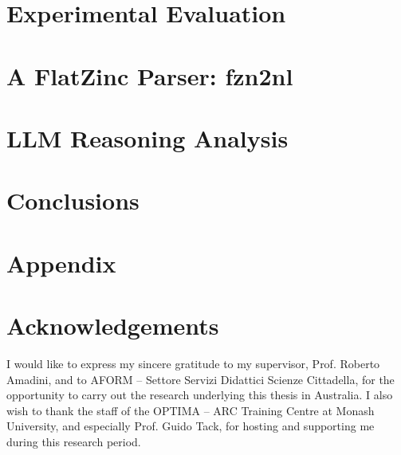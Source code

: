 \documentclass[12pt,a4paper,openright,twoside]{book}
\begin{document}
\chapter{Experimental Evaluation}
\label{chap:expEval}
\lhead[\fancyplain{}{\bfseries\thepage}]{\fancyplain{}{\bfseries\rightmark}}


\chapter{A FlatZinc Parser: fzn2nl}
\label{chap:parser}
\lhead[\fancyplain{}{\bfseries\thepage}]{\fancyplain{}{\bfseries\rightmark}}


\chapter{LLM Reasoning Analysis}
\label{chap:reasoning}
\lhead[\fancyplain{}{\bfseries\thepage}]{\fancyplain{}{\bfseries\rightmark}}


\chapter{Conclusions}
\label{chap:conclusions}
\lhead[\fancyplain{}{\bfseries\thepage}]{\fancyplain{}{\bfseries\rightmark}}


\chapter*{Appendix}



\clearpage{\pagestyle{empty}\cleardoublepage}



\clearpage{\pagestyle{empty}\cleardoublepage}
\chapter*{Acknowledgements}
\thispagestyle{empty}
I would like to express my sincere gratitude to my supervisor, Prof. Roberto Amadini, and to AFORM -- Settore Servizi Didattici Scienze Cittadella, for the opportunity to carry out the research underlying this thesis in Australia. I also wish to thank the staff of the OPTIMA -- ARC Training Centre at Monash University, and especially Prof. Guido Tack, for hosting and supporting me during this research period.
\end{document}
